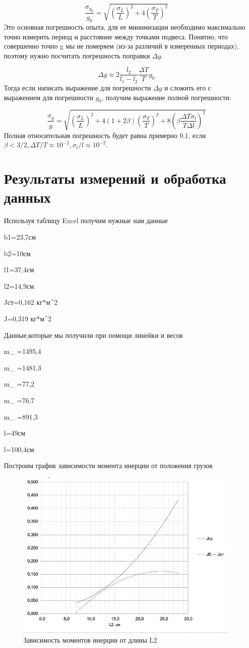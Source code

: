 \documentclass[a4paper, 10pt]{article}%
\begin{document}
\[\frac{\sigma_{g_0}}{g_0} = \sqrt{(\frac{\sigma_L}{L})^2 + 4(\frac{\sigma_T}{T})^2}\]
Это основная погрешность опыта, для ее минимизации необходимо максимально точно измерить период и расстояние между точками подвеса.
Понятно, что совершенно точно g мы не померяем (из-за различий в измеренных периодах), поэтому нужно посчитать погрешность поправки $\Delta g$.

\[\Delta g \approx 2 \frac{l_2}{l_1 - l_2} \frac{\Delta T}{T} g_0 \]
Тогда если написать выражение для погрешности $\Delta g$ и сложить его с выражением для погрешности $g_0$, получим выражение полной погрешности:

\[\frac{\sigma_g}{g} = \sqrt{(\frac{\sigma_L}{L})^2 + 4(1+2\beta)(\frac{\sigma_T}{T})^2 + 8(\beta \frac{\Delta T \sigma_l}{T \Delta l})^2}\]
Полная относительная погрешность будет равна примерно 0.1, если $\beta < 3/2, \Delta T/T \approx 10^{-2}, \sigma_l/l \approx 10^{-2}$.

\section{Результаты измерений и обработка данных}
Используя таблицу Excel получим нужные нам данные

b1=23,7см

b2=10см

l1=37,4см

l2=14,9см

Jст=0,162 кг*м^2


J=0,319 кг*м^2

Данные,которые мы получили при помощи линейки и весов 

m_{} =1495,4 

m_{} =1481,3 

m_{} =77,2 

m_{} =76,7 

m_{} =891,3 

l=49см

l=100,4см



Построим график зависимости момента инерции от положения грузов

\begin{figure}[h!]
    \centering
    \includegraphics[width=0.15\linewidth]{зависимость.png}
    \caption{Зависимость моментов инерции от длины L2}
    \label{fig:enter-label}
\end{figure}
\end{document}
